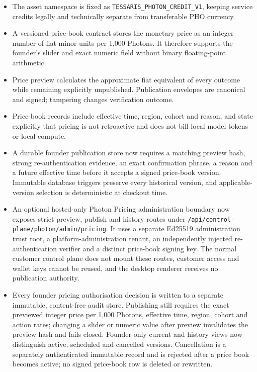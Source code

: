 \documentclass[11pt]{article}
\newcommand{\code}[1]{\texttt{#1}}
\begin{document}
\begin{itemize}
  \item The asset namespace is fixed as \code{TESSARIS\_PHOTON\_CREDIT\_V1}, keeping service credits legally and technically separate from transferable PHO currency.
  \item A versioned price-book contract stores the monetary price as an integer number of fiat minor units per 1,000 Photons. It therefore supports the founder's slider and exact numeric field without binary floating-point arithmetic.
  \item Price preview calculates the approximate fiat equivalent of every outcome while remaining explicitly unpublished. Publication envelopes are canonical and signed; tampering changes verification outcome.
  \item Price-book records include effective time, region, cohort and reason, and state explicitly that pricing is not retroactive and does not bill local model tokens or local compute.
  \item A durable founder publication store now requires a matching preview hash, strong re-authentication evidence, an exact confirmation phrase, a reason and a future effective time before it accepts a signed price-book version. Immutable database triggers preserve every historical version, and applicable-version selection is deterministic at checkout time.
  \item An optional hosted-only Photon Pricing administration boundary now exposes strict preview, publish and history routes under \code{/api/control-plane/photon/admin/pricing}. It uses a separate Ed25519 administration trust root, a platform-administration tenant, an independently injected re-authentication verifier and a distinct price-book signing key. The normal customer control plane does not mount these routes, customer access and wallet keys cannot be reused, and the desktop renderer receives no publication authority.
  \item Every founder pricing authorisation decision is written to a separate immutable, content-free audit store. Publishing still requires the exact previewed integer price per 1,000 Photons, effective time, region, cohort and action rates; changing a slider or numeric value after preview invalidates the preview hash and fails closed. Founder-only current and history views now distinguish active, scheduled and cancelled versions. Cancellation is a separately authenticated immutable record and is rejected after a price book becomes active; no signed price-book row is deleted or rewritten.

\end{itemize}
\end{document}
